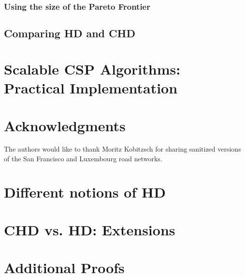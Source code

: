 \documentclass{vldb}
\begin{document}
\subsubsection{Using the size of the Pareto Frontier}


\subsection{Comparing HD and CHD}
\label{ssec:hdvschd}


\section{Scalable CSP Algorithms: \texorpdfstring{\\}{ } Practical Implementation}
\label{sec:numeric}


\balance

\section{Acknowledgments}

The authors would like to thank Moritz Kobitzsch for sharing sanitized versions of the San Francisco and Luxembourg road networks.


 


\begin{appendix}

\section{Different notions of HD}
\label{app:generalhd}


% 

\section{CHD vs. HD: Extensions}
\label{app:extn}



\section{Additional Proofs}
\label{sec:proofs}


\end{appendix}
\end{document}
